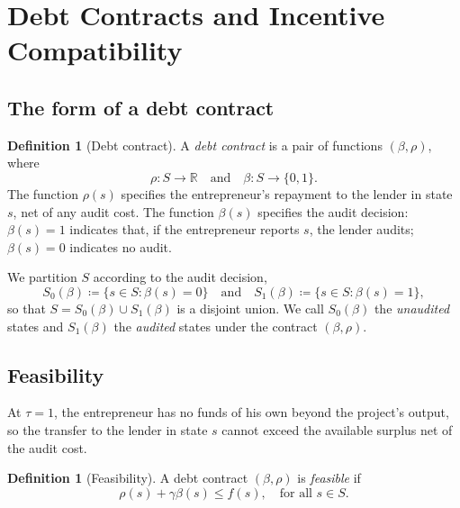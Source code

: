 \documentclass[11pt,a4paper,oneside]{book}
\def\R{\mathbb{R}}
\def\leq{\leqslant}
\def\et{\quad \text{and} \quad}
\theoremstyle{plain}
\theoremstyle{definition}
\newtheorem{definition}[theorem]{Definition}
\theoremstyle{remark}
\numberwithin{equation}{chapter}
\begin{document}
\section{Debt Contracts and Incentive Compatibility}
\label{sec:GH-contract}

\subsection{The form of a debt contract}

\begin{definition}[Debt contract]\label{def:GH-contract}
A \emph{debt contract} is a pair of functions $(\beta, \rho)$, where
\begin{equation*}
  \rho : S \longrightarrow \R
  \et
  \beta : S \longrightarrow \{0, 1\}.
\end{equation*}
The function $\rho(s)$ specifies the entrepreneur's repayment to the lender in state $s$, net of any audit cost.
The function $\beta(s)$ specifies the audit decision: $\beta(s) = 1$ indicates that, if the entrepreneur reports $s$, the lender audits; $\beta(s) = 0$ indicates no audit.
\end{definition}

We partition $S$ according to the audit decision,
\begin{equation}\label{eq:S01-def}
  S_0(\beta) \coloneqq \{ s \in S \colon \beta(s) = 0 \}
  \et
  S_1(\beta) \coloneqq \{ s \in S \colon \beta(s) = 1 \},
\end{equation}
so that $S = S_0(\beta) \cup S_1(\beta)$ is a disjoint union.
We call $S_0(\beta)$ the \emph{unaudited} states and $S_1(\beta)$ the \emph{audited} states under the contract $(\beta, \rho)$.

\subsection{Feasibility}

At $\tau = 1$, the entrepreneur has no funds of his own beyond the project's output, so the transfer to the lender in state $s$ cannot exceed the available surplus net of the audit cost.

\begin{definition}[Feasibility]\label{def:GH-feasibility}
A debt contract $(\beta, \rho)$ is \emph{feasible} if
\begin{equation}\label{eq:F}
  \rho(s) + \gamma \beta(s) \leq f(s), \quad \text{for all $s\in S$}.
  \tag{F}
\end{equation}
\end{definition}
\end{document}
